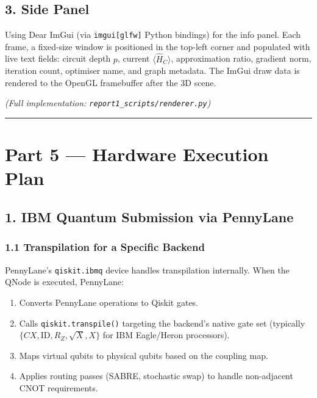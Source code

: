 \documentclass[
  11pt,
]{report}
\providecommand{\tightlist}{%
  \setlength{\itemsep}{0pt}\setlength{\parskip}{0pt}}
\begin{document}
\subsection{3. Side Panel}\label{side-panel}

Using Dear ImGui (via \texttt{imgui{[}glfw{]}} Python bindings) for the
info panel. Each frame, a fixed-size window is positioned in the
top-left corner and populated with live text fields: circuit depth
\(p\), current \(\langle \hat{H}_C \rangle\), approximation ratio,
gradient norm, iteration count, optimiser name, and graph metadata. The
ImGui draw data is rendered to the OpenGL framebuffer after the 3D
scene.

\emph{(Full implementation: \texttt{report1\_scripts/renderer.py})}

\begin{center}\rule{0.5\linewidth}{0.5pt}\end{center}

\section{Part 5 --- Hardware Execution
Plan}\label{part-5-hardware-execution-plan}

\subsection{1. IBM Quantum Submission via
PennyLane}\label{ibm-quantum-submission-via-pennylane}

\subsubsection{1.1 Transpilation for a Specific
Backend}\label{transpilation-for-a-specific-backend}

PennyLane's \texttt{qiskit.ibmq} device handles transpilation
internally. When the QNode is executed, PennyLane:

\begin{enumerate}
\def\labelenumi{\arabic{enumi}.}
\tightlist
\item
  Converts PennyLane operations to Qiskit gates.
\item
  Calls \texttt{qiskit.transpile()} targeting the backend's native gate
  set (typically \(\{CX, \text{ID}, R_Z, \sqrt{X}, X\}\) for IBM
  Eagle/Heron processors).
\item
  Maps virtual qubits to physical qubits based on the coupling map.
\item
  Applies routing passes (SABRE, stochastic swap) to handle non-adjacent
  CNOT requirements.
\end{enumerate}
\end{document}
